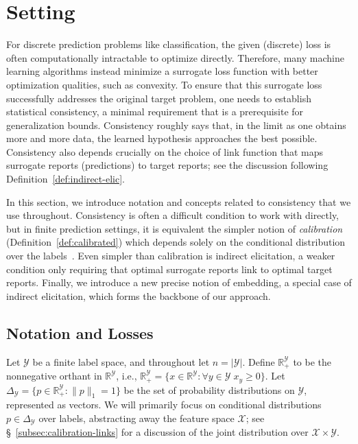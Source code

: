 \documentclass[twoside,11pt]{article}
\newcommand{\reals}{\mathbb{R}}
\newcommand{\simplex}{\Delta_\Y}
\newcommand{\X}{\mathcal{X}}
\newcommand{\Y}{\mathcal{Y}}
\begin{document}
\section{Setting}
\label{sec:setting}

For discrete prediction problems like classification, the given (discrete) loss is often computationally intractable to optimize directly.
Therefore, many machine learning algorithms instead minimize a surrogate loss function with better optimization qualities, such as convexity.
To ensure that this surrogate loss successfully addresses the original target problem, one needs to establish statistical consistency, a minimal requirement that is a prerequisite for generalization bounds.
Consistency roughly says that, in the limit as one obtains more and more data, the learned hypothesis approaches the best possible.
Consistency also depends crucially on the choice of link function that maps surrogate reports (predictions) to target reports; see the discussion following Definition~\ref{def:indirect-elic}.

In this section, we introduce notation and concepts related to consistency that we use throughout.
Consistency is often a difficult condition to work with directly, but in finite prediction settings, it is equivalent the simpler notion of \emph{calibration} (Definition~\ref{def:calibrated}) which depends solely on the conditional distribution over the labels~\citep{bartlett2006convexity,tewari2007consistency,ramaswamy2016convex}.
Even simpler than calibration is indirect elicitation, a weaker condition only requiring that optimal surrogate reports link to optimal target reports.
Finally, we introduce a new precise notion of embedding, a special case of indirect elicitation, which forms the backbone of our approach.


\subsection{Notation and Losses}
\label{sec:notation-losses}

Let $\Y$ be a finite label space, and throughout let $n=|\Y|$.
Define $\reals^\Y_+$ to be the nonnegative orthant in $\reals^\Y$, i.e., $\reals^\Y_+ = \{x \in \reals^\Y : \forall y\in\Y\; x_y \geq 0 \}$.
Let $\simplex = \{p\in\reals^{\Y}_+ : \|p\|_1 = 1\}$ be the set of probability distributions on $\Y$, represented as vectors.
We will primarily focus on conditional distributions $p\in\simplex$ over labels, abstracting away the feature space $\X$; see \S~\ref{subsec:calibration-links} for a discussion of the joint distribution over $\X\times\Y$.
\end{document}
